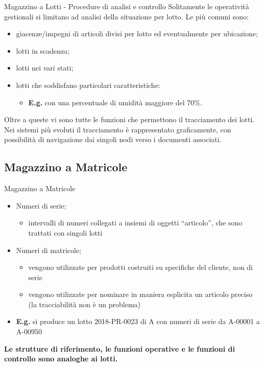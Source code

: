 \documentclass{beamer}
\begin{document}
\begin{frame}{Magazzino a Lotti - Procedure di analisi e controllo}
    Solitamente le operatività gestionali si limitano ad analisi della situazione per lotto. Le più comuni sono:
    \begin{itemize}
        \item giacenze/impegni di articoli divisi per lotto ed eventualmente per ubicazione;
        \item lotti in scadenza;
        \item lotti nei vari stati;
        \item lotti che soddisfano particolari caratteristiche:
        \begin{itemize}
            \item \textbf{E.g.} con una percentuale di umidità maggiore del 70\%.
        \end{itemize}
    \end{itemize}
    Oltre a queste vi sono tutte le funzioni che permettono il tracciamento dei lotti. Nei sistemi più evoluti il tracciamento è rappresentato graficamente, con possibilità di navigazione dai singoli nodi verso i documenti associati.
\end{frame}

\subsection{Magazzino a Matricole}
\begin{frame}{Magazzino a Matricole}
    \begin{itemize}
        \item Numeri di serie;
        \begin{itemize}
            \item intervalli di numeri collegati a insiemi di oggetti “articolo”, che sono trattati con singoli lotti
        \end{itemize}
        \item Numeri di matricole;
        \begin{itemize}
            \item vengono utilizzate per prodotti costruiti su specifiche del cliente, non di serie
            \item vengono utilizzate per nominare in maniera esplicita un articolo preciso (la tracciabilità non è un problema)
        \end{itemize}
        \item \textbf{E.g.} si produce un lotto 2018-PR-0023 di A con numeri di serie da A-00001 a A-00950
    \end{itemize}
    \vspace{1.5em}
    \textbf{Le strutture di riferimento, le funzioni operative e le funzioni di controllo sono analoghe ai lotti.}
\end{frame}
\end{document}

